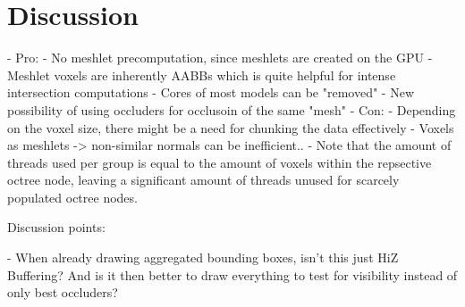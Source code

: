 \chapter{Discussion} \label{cpt-discussion}


- Pro: 
    - No meshlet precomputation, since meshlets are created on the GPU
    - Meshlet voxels are inherently AABBs which is quite helpful for intense intersection computations %
    - Cores of most models can be "removed"
    - New possibility of using occluders for occlusoin of the same "mesh"
- Con:
    - Depending on the voxel size, there might be a need for chunking the data effectively %
    - Voxels as meshlets -> non-similar normals can be inefficient.. 
    - Note that the amount of threads used per group is equal to the amount of voxels within the repsective octree 
    node, leaving a significant amount of threads unused for scarcely populated octree nodes.


Discussion points:

- When already drawing aggregated bounding boxes, isn't this just HiZ Buffering? And is it then better to draw everything
 to test for visibility instead of only best occluders? 